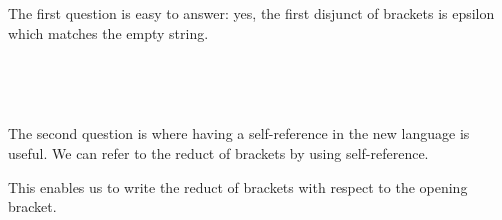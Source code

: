 
The first question is easy to answer: yes, the first disjunct of brackets is epsilon which matches the empty string.
%
\begin{code}[hide]%
%
\>[4]\AgdaSpace{}%
\AgdaSymbol{=}\AgdaSpace{}%
\AgdaSpace{}%
\AgdaSpace{}%
\AgdaSpace{}%
\AgdaString{'['}\AgdaSpace{}%
\AgdaSpace{}%
\AgdaSpace{}%
\AgdaSpace{}%
\AgdaSpace{}%
\AgdaString{']'}\AgdaSpace{}%
\AgdaSpace{}%
\AgdaSpace{}%
\AgdaSpace{}%
\<%
\\
%
\>[4]\AgdaSpace{}%
\AgdaSymbol{=}\AgdaSpace{}%
\AgdaSpace{}%
\AgdaSpace{}%
\<%
\end{code}
\begin{code}%
%
\>[4]\AgdaSpace{}%
\AgdaSymbol{:}\AgdaSpace{}%
\AgdaSpace{}%
\AgdaSymbol{(}\AgdaSpace{}%
\AgdaSymbol{)}\<%
\\
%
\>[4]\AgdaSpace{}%
\AgdaSymbol{=}\AgdaSpace{}%
\AgdaSpace{}%
\AgdaSymbol{(}\AgdaSpace{}%
\AgdaSymbol{(}\AgdaSpace{}%
\AgdaSymbol{))}\<%
\end{code}

The second question is where having a self-reference in the new language is useful. We can refer to the reduct of brackets by using self-reference.

This enables us to write the reduct of brackets with respect to the opening bracket.

\begin{code}%
%
\>[4]%
\>[16]\AgdaSymbol{=}\AgdaSpace{}%
\AgdaSpace{}%
\AgdaSpace{}%
\AgdaSpace{}%
\AgdaSpace{}%
\AgdaString{']'}\AgdaSpace{}%
\AgdaSpace{}%
\AgdaSpace{}%
\AgdaSpace{}%
\AgdaSpace{}%
\AgdaSpace{}%
\AgdaSpace{}%
\AgdaSpace{}%
\AgdaSpace{}%
\<%
\\
%
\>[4]%
\>[16]\AgdaSymbol{=}\AgdaSpace{}%
\AgdaSpace{}%
\AgdaSpace{}%
\<%
\end{code}

